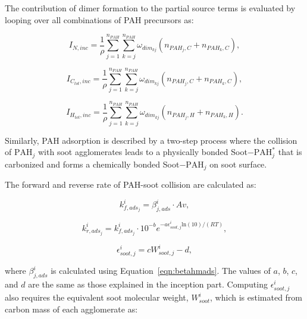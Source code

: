 The contribution of dimer formation to the partial source terms is evaluated by looping over all combinations of PAH precursors as:


\begin{equation}
	I_{N,{inc}} = 
	\frac{1}{\rho}
	\sum_{j=1}^{n_{PAH}} \sum_{k=j}^{n_{PAH}}  \omega_{dim_{kj}} 
	\left(
	n_{PAH_j,C}+n_{PAH_k,C}
	\right),
	\label{eqn:IN_inc}
\end{equation}

\begin{equation}
	I_{C_{tot},{inc}} = 
	\frac{1}{\rho}
	\sum_{j=1}^{n_{PAH}} \sum_{k=j}^{n_{PAH}}  \omega_{dim_{kj}} 
	\left(
	n_{PAH_j,C}+n_{PAH_k,C}
	\right),
	\label{eqn:ICtot_inc}
\end{equation}

\begin{equation}
	I_{H_{tot},{inc}} = 
	\frac{1}{\rho}
	\sum_{j=1}^{n_{PAH}} \sum_{k=j}^{n_{PAH}}  \omega_{dim_{kj}} 
	\left(
	n_{PAH_j,H}+n_{PAH_k,H}
	\right).
	\label{eqn:IHtot_inc}
\end{equation}

Similarly, PAH adsorption is described by a two-step process where the collision of $\mathrm{PAH}_j$ with soot agglomerates leads to a physically bonded Soot$-$$\mathrm{PAH}^*_j$ that is carbonized and forms a chemically bonded Soot$-$$\mathrm{PAH}_j$ on soot surface.



The forward and reverse rate of PAH-soot collision are calculated as:

\begin{equation}
	k^i_{f,ads_j}=\beta^i_{j,ads}\cdot Av,
	\label{eqn:kfads_reacdim}
\end{equation}

\begin{equation}
	k^i_{r,ads_j}=k^i_{f,ads_j}\cdot10^{-b}e^{-a\epsilon^i_{soot,j} \mathrm{ln}(10)/(RT)},
	\label{eqn:krads_reacdim}
\end{equation}

\begin{equation}
	\epsilon^i_{soot,j} = cW^i_{soot,j} - d,
	\label{eqn:epsilonads_reacdim}
\end{equation}

\noindent where $\beta^i_{j,ads}$ is calculated using Equation~\eqref{eqn:betahmads}. The values of $a$, $b$, $c$, and $d$ are the same as those explained in the inception part. Computing ${\epsilon^i_{soot,j}}$ also requires the equivalent soot molecular weight, ${W^i_{soot}}$, which is estimated from carbon mass of each agglomerate as:


